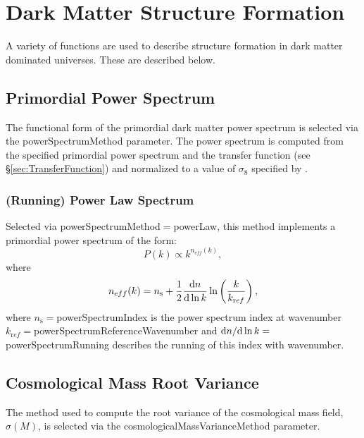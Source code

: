 \section{Dark Matter Structure Formation}

A variety of functions are used to describe structure formation in dark matter dominated universes. These are described below.

\subsection{Primordial Power Spectrum}\label{sec:PrimordialPowerSpectrum}

The functional form of the primordial dark matter power spectrum is selected via the {\normalfont \ttfamily powerSpectrumMethod} parameter. The power spectrum is computed from the specified primordial power spectrum and the transfer function (see \S\ref{sec:TransferFunction}) and normalized to a value of $\sigma_8$ specified by {\normalfont \ttfamily [sigma\_8]}.

\subsubsection{(Running) Power Law Spectrum}

Selected via {\normalfont \ttfamily powerSpectrumMethod}$=${\normalfont \ttfamily powerLaw}, this method implements a primordial power spectrum of the form:
\begin{equation}
 P(k) \propto k^{n_{\mathrm eff}(k)},
\end{equation}
where
\begin{equation}
 n_{\mathrm eff}(k) = n_{\mathrm s} + {1\over 2}{\d n \over \d \ln k} \ln \left( {k \over k_{\mathrm ref}} \right),
\end{equation}
where $n_{\mathrm s}=${\normalfont \ttfamily powerSpectrumIndex} is the power spectrum index at wavenumber $k_{\mathrm ref}=${\normalfont \ttfamily powerSpectrumReferenceWavenumber} and $\d n / \d \ln k=${\normalfont \ttfamily powerSpectrumRunning} describes the running of this index with wavenumber.

\subsection{Cosmological Mass Root Variance}

The method used to compute the root variance of the cosmological mass field, $\sigma(M)$, is selected via the {\normalfont \ttfamily cosmologicalMassVarianceMethod} parameter.
